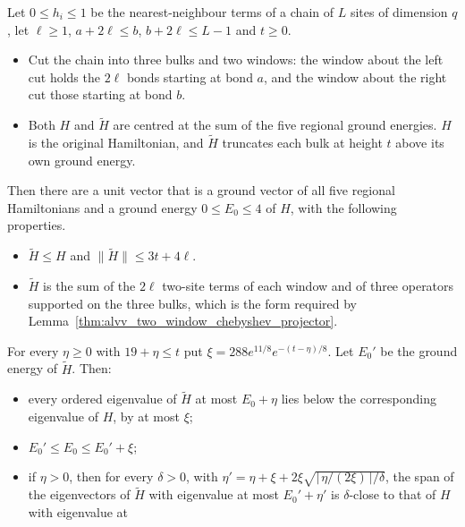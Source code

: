 \begin{lemma}
    \label{lem:alvv_three_bulk_hard_truncation_spectral_comparison}
    \leanok
    Let $0\le h_i\le1$ be the nearest-neighbour terms of a chain of $L$ sites
    of dimension $q$, let $\ell\ge1$, $a+2\ell\le b$, $b+2\ell\le L-1$ and
    $t\ge0$.
    \begin{itemize}
        \item Cut the chain into three bulks and two windows: the window
              about the left cut holds the $2\ell$ bonds starting at bond $a$,
              and the window about the right cut those starting at bond $b$.
        \item Both $H$ and $\tilde H$ are centred at the sum of the five
              regional ground energies. $H$ is the original Hamiltonian, and
              $\tilde H$ truncates each bulk at height $t$ above its own ground
              energy.
    \end{itemize}
    Then there are a unit vector that is a ground vector of all five regional
    Hamiltonians and a ground energy $0\le E_0\le4$ of $H$, with the
    following properties.
    \begin{itemize}
        \item $\tilde H\le H$ and $\|\tilde H\|\le3t+4\ell$.
        \item $\tilde H$ is the sum of the $2\ell$ two-site terms of each
              window and of three operators supported on the three bulks,
              which is the form required by
              Lemma~\ref{thm:alvv_two_window_chebyshev_projector}.
    \end{itemize}
    For every $\eta\ge0$ with $19+\eta\le t$ put
    $\xi=288e^{11/8}e^{-(t-\eta)/8}$. Let $E_0'$ be the ground energy of
    $\tilde H$. Then:
    \begin{itemize}
        \item every ordered eigenvalue of $\tilde H$ at most $E_0+\eta$ lies
              below the corresponding eigenvalue of $H$, by at most $\xi$;
        \item $E_0'\le E_0\le E_0'+\xi$;
        \item if $\eta>0$, then for every $\delta>0$, with
              $\eta'=\eta+\xi+2\xi\sqrt{\lceil\eta/(2\xi)\rceil/\delta}$, the
              span of the eigenvectors of $\tilde H$ with eigenvalue at most
              $E_0'+\eta'$ is $\delta$-close to that of $H$ with eigenvalue at

\end{itemize}
\end{lemma}
